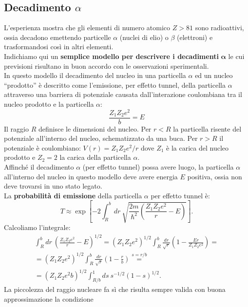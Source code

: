 \documentclass[a4paper,12pt,twoside]{book}
\begin{document}
\subsection{Decadimento $\alpha$}
L'esperienza mostra che gli elementi di numero atomico $Z>81$ sono radioattivi, ossia decadono emettendo particelle $\alpha$ (nuclei di elio) o $\beta$ (elettroni) e trasformandosi così in altri elementi.\\
Indichiamo qui un \textbf{semplice modello per descrivere i decadimenti} $\mathbf{\alpha}$ le cui previsioni risultano in buon accordo con le osservazioni sperimentali.\\
In questo modello il decadimento del nucleo in una particella $\alpha$ ed un nucleo ``prodotto'' è descritto come l'emissione, per effetto tunnel, della particella $\alpha$ attraverso una barriera di potenziale causata dall'interazione coulombiana tra il nucleo prodotto e la particella $\alpha$:
\[\frac{Z_1 Z_2 e^2}{b}=E\]
Il raggio $R$ definisce le dimensioni del nucleo. Per $r<R$ la particella risente  del potenziale all'interno del nucleo, schematizzato da una buca. Per $r>R$ il potenziale è coulombiano: $V(r)=Z_1 Z_2 e^2/r$ dove $Z_1$ è la carica del nucleo prodotto e $Z_2=2$ la carica della particella $\alpha$.\\
Affinché il decadimento $\alpha$ (per effetto tunnel) possa avere luogo, la particella $\alpha$ all'interno del nucleo in questo modello deve avere energia $E$ positiva, ossia non deve trovarsi in uno stato legato.\\
La \textbf{probabilità di emissione} della particella $\alpha$ per effetto tunnel è:
\begin{equation}
T \approx \exp \left[ -2 \int _R ^b dr\ \sqrt{\frac{2m}{\hbar ^2}\left(\frac{Z_1 Z_2 e^2}{r}-E\right)}\right].
\end{equation}
Calcoliamo l'integrale:
\begin{eqnarray}
&\displaystyle{\int _R ^b dr\ \left(\frac{Z_1 Z_2 e^2}{r}-E\right)^{1/2}=\left(Z_1 Z_2 e^2\right)^{1/2}\int _R ^b \frac{dr}{\sqrt{r}}\left(1-\frac{Er}{Z_1 Z_2 e^2}\right)=}& \nonumber \\
&\displaystyle{=\left(Z_1 Z_2 e^2\right)^{1/2}\int _R ^b \frac{dr}{\sqrt{r}}\left(1-\frac{r}{b}\right)\overset{s=r/b}{=}}&\nonumber \\
&=\displaystyle{\left(Z_1 Z_2 e^2 b\right)^{1/2}\int _{R/b} ^1 ds\ s^{-1/2} (1-s)^{1/2}}.&
\end{eqnarray}
La piccolezza del raggio nucleare fa sì che risulta sempre valida con buona approssimazione la condizione
\end{document}
